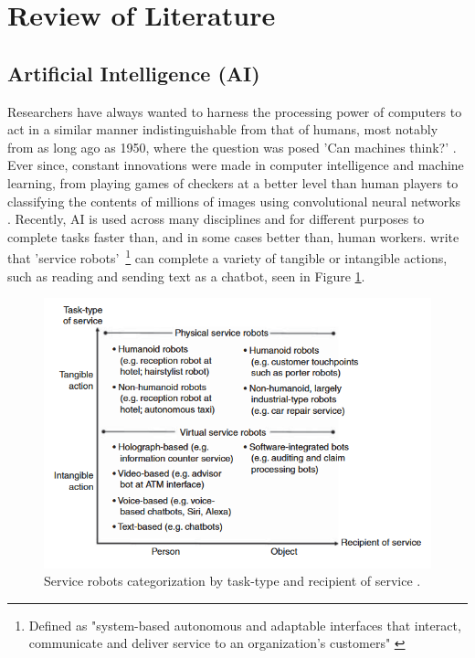 \documentclass[12pt]{report}
\begin{document}
    \pagebreak %

    \section{Review of Literature}

    \subsection{Artificial Intelligence (AI)}


    Researchers have always wanted to harness the processing power of computers to act in a similar manner 
    indistinguishable from that of humans, most notably from as long ago as 1950, where the question was posed 
    'Can machines think?' \autocite{turing_icomputing_1950}. Ever since, constant innovations were made in computer 
    intelligence and machine learning, from playing games of checkers at a better level than human players \autocite{samuel_studies_1959}
    to classifying the contents of millions of images using convolutional neural networks \autocite{krizhevsky_imagenet_2012}.
    Recently, AI is used across many disciplines and for different purposes to complete tasks faster than, and in some cases better than,
    human workers. \textcite{wirtz_brave_2018} write that 'service robots'~\footnote{Defined as "system-based autonomous and adaptable interfaces that 
    interact, communicate and deliver service to an organization’s customers" \autocite[p.909]{wirtz_brave_2018}} can complete a variety of 
    tangible or intangible actions, such as reading and sending text as a chatbot, seen in Figure \ref{fig:serviceBots}.
    
    \begin{figure}[H]
        \centering
        \includegraphics[width=.8\linewidth]{serviceBots.png}
        \caption{Service robots categorization by task-type and recipient of service \autocite{wirtz_brave_2018}.}
        \label{fig:serviceBots}
    \end{figure}
\end{document}
